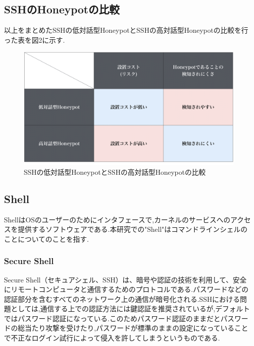\subsection{SSHのHoneypotの比較}
\label{tech:CompareHoneypot}
以上をまとめたSSHの低対話型HoneypotとSSHの高対話型Honeypotの比較を行った表を図2に示す.

\vspace{10mm}
\begin{figure}[H]
    \centering
    \includegraphics[width=1.0\textwidth]{figures/compare.png}
    \caption{SSHの低対話型HoneypotとSSHの高対話型Honeypotの比較}
    \label{fig:evo}
\end{figure}


\subsection{Shell}
\label{tech:Shell}
ShellはOSのユーザーのためにインタフェースで,カーネルのサービスへのアクセスを提供するソフトウェアである.本研究での"Shell"はコマンドラインシェルのことについてのことを指す.

\subsubsection{Secure Shell}
\label{tech:Secure Shell}
Secure Shell（セキュアシェル、SSH）は、暗号や認証の技術を利用して、安全にリモートコンピュータと通信するためのプロトコルである.パスワードなどの認証部分を含むすべてのネットワーク上の通信が暗号化される.\cite{ssh}SSHにおける問題としては,通信する上での認証方法には鍵認証を推奨されているが,デフォルトではパスワード認証になっている.このためパスワード認証のままだとパスワードの総当たり攻撃を受けたり,パスワードが標準のままの設定になっていることで不正なログイン試行によって侵入を許してしまうというものである.

